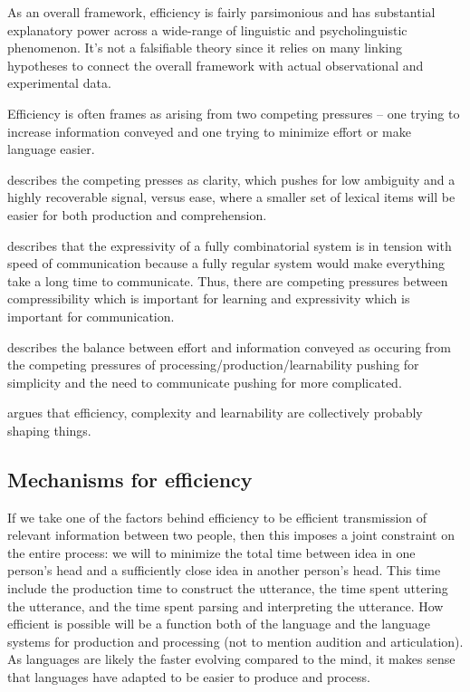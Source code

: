 \documentclass[]{article}
\begin{document}
As an overall framework, efficiency is fairly parsimonious and has substantial explanatory power across a wide-range of linguistic and psycholinguistic phenomenon. It's not a falsifiable theory since it relies on many linking hypotheses to connect the overall framework with actual observational and experimental data. %

Efficiency is often frames as arising from two competing pressures -- one trying to increase information conveyed and one trying to minimize effort or make language easier. 

\cite{piantadosi2012} describes the competing presses as clarity, which pushes for low ambiguity and a highly recoverable signal, versus ease, where a smaller set of lexical items will be easier for both production and comprehension. 

\cite{kirby2015} describes that the expressivity of a fully combinatorial system is in tension with speed of communication because a fully regular system would make everything take a long time to communicate. Thus, there are competing pressures between compressibility which is important for learning and expressivity which is important for communication. %

\cite{???} describes the balance between effort and information conveyed as occuring from the competing pressures of processing/production/learnability pushing for simplicity and the need to communicate pushing for more complicated. 

\cite{gibson2019} argues that efficiency, complexity and learnability are collectively probably shaping things. %


\subsection{Mechanisms for efficiency}

If we take one of the factors behind efficiency to be efficient transmission of relevant information between two people, then this imposes a joint constraint on the entire process: we will to minimize the total time between idea in one person's head and a sufficiently close idea in another person's head. This time include the production time to construct the utterance, the time spent uttering the utterance, and the time spent parsing and interpreting the utterance. How efficient is possible will be a function both of the language and the language systems for production and processing (not to mention audition and articulation). As languages are likely the faster evolving compared to the mind, it makes sense that languages have adapted to be easier to produce and process. 
\end{document}
